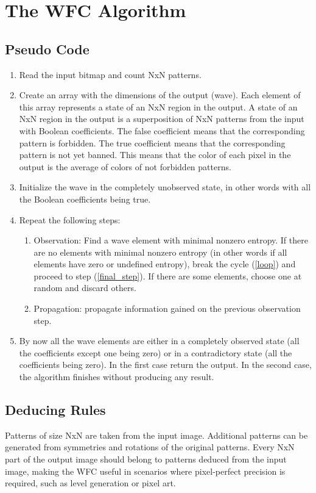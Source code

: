 \documentclass[shortabstract, english, inz]{iithesis}
\begin{document}
\chapter{The WFC Algorithm}
\label{chapter3}
\section{Pseudo Code}
\begin{enumerate}
    \item Read the input bitmap and count NxN patterns.
    \item Create an array with the dimensions of the output (wave). Each element of this array represents a state of an NxN region in the output. A state of an NxN region in the output is a superposition of NxN patterns from the input with Boolean coefficients. The false coefficient means that the corresponding pattern is forbidden. The true coefficient means that the corresponding pattern is not yet banned. This means that the color of each pixel in the output is the average of colors of not forbidden patterns.
    \item Initialize the wave in the completely unobserved state, in other words with all the Boolean coefficients being true.
    \item \label{loop}Repeat the following steps:
    \begin{enumerate}
        \item Observation:
Find a wave element with minimal nonzero entropy. If there are no elements with minimal nonzero entropy (in other words if all elements have zero or undefined entropy), break the cycle (\ref{loop}) and proceed to step (\ref{final_step}). If there are some elements, choose one at random and discard others.
        \item Propagation: propagate information gained on the previous observation step.
    \end{enumerate}
    \item \label{final_step}By now all the wave elements are either in a completely observed state (all the coefficients except one being zero) or in a contradictory state (all the coefficients being zero). In the first case return the output. In the second case, the algorithm finishes without producing any result.
\end{enumerate}
\cite{MaximGumin}

\section{Deducing Rules}
Patterns of size NxN are taken from the input image. Additional patterns can be generated from symmetries and rotations of the original patterns. Every NxN part of the output image should belong to patterns deduced from the input image, making the WFC useful in scenarios where pixel-perfect precision is required, such as level generation or pixel art. \cite{MaximGumin}
\end{document}
